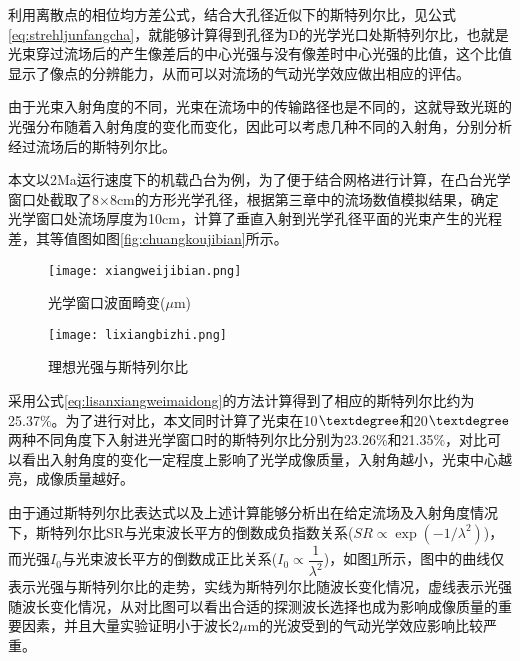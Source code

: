 利用离散点的相位均方差公式，结合大孔径近似下的斯特列尔比，见公式\eqref{eq:strehljunfangcha}，就能够计算得到孔径为D的光学光口处斯特列尔比，也就是光束穿过流场后的产生像差后的中心光强与没有像差时中心光强的比值，这个比值显示了像点的分辨能力，从而可以对流场的气动光学效应做出相应的评估。

由于光束入射角度的不同，光束在流场中的传输路径也是不同的，这就导致光斑的光强分布随着入射角度的变化而变化，因此可以考虑几种不同的入射角，分别分析经过流场后的斯特列尔比。

本文以2Ma运行速度下的机载凸台为例，为了便于结合网格进行计算，在凸台光学窗口处截取了8$\times$8cm的方形光学孔径，根据第三章中的流场数值模拟结果，确定光学窗口处流场厚度为10cm，计算了垂直入射到光学孔径平面的光束产生的光程差，其等值图如图\ref{fig:chuangkoujibian}所示。

\begin{figure}[bhtp]
\begin{minipage}[b]{0.45\linewidth}
\centering
\texttt{[image: xiangweijibian.png]}
\caption{光学窗口波面畸变($\mu$m)}
\label{fig:chuangkoujibian}
\end{minipage}
\begin{minipage}[b]{0.5\linewidth}
\centering
\texttt{[image: lixiangbizhi.png]}
\caption{理想光强与斯特列尔比}
\label{fig:lixiangsite}
\end{minipage}
\end{figure}

采用公式\eqref{eq:lisanxiangweimaidong}的方法计算得到了相应的斯特列尔比约为25.37\%。为了进行对比，本文同时计算了光束在10$\textdegree$和20$\textdegree$两种不同角度下入射进光学窗口时的斯特列尔比分别为23.26\%和21.35\%，对比可以看出入射角度的变化一定程度上影响了光学成像质量，入射角越小，光束中心越亮，成像质量越好。


由于通过斯特列尔比表达式以及上述计算能够分析出在给定流场及入射角度情况下，斯特列尔比SR与光束波长平方的倒数成负指数关系($SR\propto\exp(-1/\lambda^2)$)，而光强$I_0$与光束波长平方的倒数成正比关系($I_0\propto\dfrac{1}{\lambda^2}$)，如图\ref{fig:lixiangsite}所示，图中的曲线仅表示光强与斯特列尔比的走势，实线为斯特列尔比随波长变化情况，虚线表示光强随波长变化情况，从对比图可以看出合适的探测波长选择也成为影响成像质量的重要因素，并且大量实验证明小于波长2$\mu$m的光波受到的气动光学效应影响比较严重。


